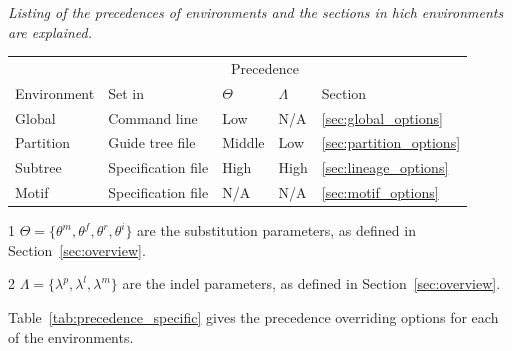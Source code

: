 \documentclass[10pt]{article}
\begin{document}
\begin{center}
\begin{threeparttable}
\caption{\it Listing of the precedences of environments and the sections in hich environments are explained.}
\begin{tabular}{lllll}
\hline\hline
            &        & \multicolumn{2}{c}{Precedence} & \\\cline{3-4}
Environment & Set in   & $\Theta$\tnote{1} & $\Lambda$\tnote{1} & Section
\\\hline
Global    & Command line       & Low      & N/A & \ref{sec:global_options} \\
Partition & Guide tree file    & Middle   & Low & \ref{sec:partition_options}\\
Subtree   & Specification file & High     & High&\ref{sec:lineage_options} \\
Motif     & Specification file & N/A      & N/A &\ref{sec:motif_options} \\
\hline\hline
\end{tabular}
\begin{tablenotes}
\item[1] $\Theta = \{\theta^m,\theta^f,\theta^r,\theta^i\}$ are the substitution parameters, as defined in Section~\ref{sec:overview}.
\item[2] $\Lambda = \{\lambda^p,\lambda^l,\lambda^m\}$ are the indel parameters, as defined in Section~\ref{sec:overview}.
\end{tablenotes}
\label{tab:precedence}
\end{threeparttable}
\end{center}

Table~\ref{tab:precedence_specific} gives the precedence overriding options for each of the environments.
\end{document}

